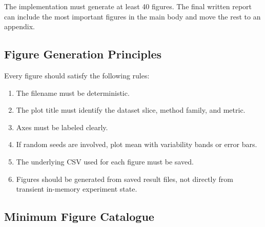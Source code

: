 \documentclass[11pt]{article}
\begin{document}
The implementation must generate at least 40 figures. The final written report can include the most important figures in the main body and move the rest to an appendix.

\subsection{Figure Generation Principles}

Every figure should satisfy the following rules:

\begin{enumerate}
    \item The filename must be deterministic.
    \item The plot title must identify the dataset slice, method family, and metric.
    \item Axes must be labeled clearly.
    \item If random seeds are involved, plot mean with variability bands or error bars.
    \item The underlying CSV used for each figure must be saved.
    \item Figures should be generated from saved result files, not directly from transient in-memory experiment state.
\end{enumerate}

\subsection{Minimum Figure Catalogue}
\end{document}
